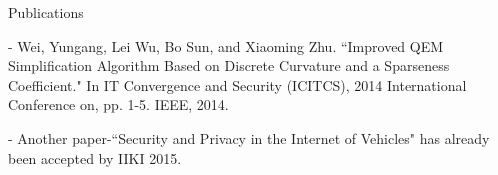 \documentclass{resume} %
\begin{document}
\begin{rSection}{Publications}
\item[-] Wei, Yungang, Lei Wu, Bo Sun, and Xiaoming Zhu. ``Improved QEM Simplification Algorithm Based on Discrete Curvature and a Sparseness Coefficient." In IT Convergence and Security (ICITCS), 2014 International Conference on, pp. 1-5. IEEE, 2014.
\item[-] Another paper-``Security and Privacy in the Internet of Vehicles" has already been accepted by IIKI 2015.
\end{rSection}





\end{document}

